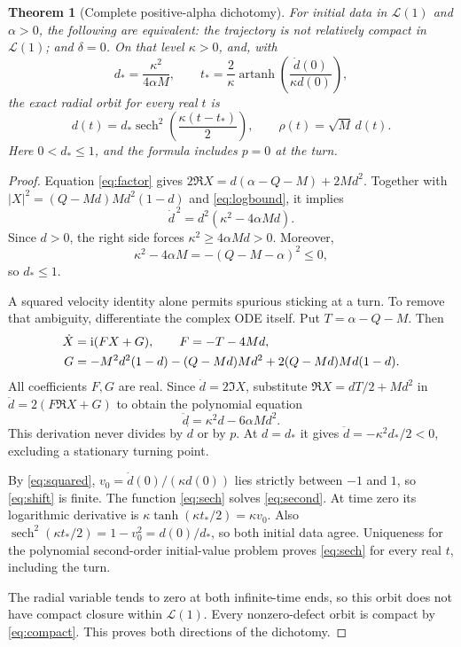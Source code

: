 \documentclass[10pt]{article}
\newcommand{\ii}{\mathrm i}
\newcommand{\LL}{\mathcal L}
\DeclareMathOperator{\sech}{sech}
\DeclareMathOperator{\artanh}{artanh}
\newtheorem{theorem}{Theorem}
\begin{document}
\begin{theorem}[Complete positive-alpha dichotomy]
For initial data in $\LL(1)$ and $\alpha>0$, the following are equivalent:
the trajectory is not relatively compact in $\LL(1)$; and $\delta=0$.
On that level $\kappa>0$, and, with
\begin{equation}
 d_*=\frac{\kappa^2}{4\alpha M},\qquad
 t_*=\frac2\kappa\artanh\left(\frac{\dot d(0)}{\kappa d(0)}\right),
 \label{eq:shift}
\end{equation}
the exact radial orbit for every real $t$ is
\begin{equation}
 d(t)=d_*\sech^2\left(\frac{\kappa(t-t_*)}{2}\right),\qquad
 \rho(t)=\sqrt M\,d(t).
 \label{eq:sech}
\end{equation}
Here $0<d_*\le1$, and the formula includes $p=0$ at the turn.
\end{theorem}
\begin{proof}
Equation \eqref{eq:factor} gives
$2\Re X=d(\alpha-Q-M)+2Md^2$.
Together with $|X|^2=(Q-Md)Md^2(1-d)$ and \eqref{eq:logbound}, it implies
\begin{equation}
 \dot d^{\,2}=d^2(\kappa^2-4\alpha Md).
 \label{eq:squared}
\end{equation}
Since $d>0$, the right side forces
$\kappa^2\ge4\alpha Md>0$. Moreover,
\begin{equation}
 \kappa^2-4\alpha M=-(Q-M-\alpha)^2\le0,
 \label{eq:dstar}
\end{equation}
so $d_*\le1$.

A squared velocity identity alone permits spurious sticking at a turn.
To remove that ambiguity, differentiate the complex ODE itself.
Put $T=\alpha-Q-M$. Then
\begin{align}
 \dot X&=\ii(FX+G),\qquad F=-T-4Md,\notag\\
 G&=-M^2d^2(1-d)-(Q-Md)Md^2
       +2(Q-Md)Md(1-d).
 \label{eq:xderivative}
\end{align}
All coefficients $F,G$ are real. Since $\dot d=2\Im X$,
substitute $\Re X=dT/2+Md^2$ in
$\ddot d=2(F\Re X+G)$ to obtain the polynomial equation
\begin{equation}
 \ddot d=\kappa^2d-6\alpha Md^2.
 \label{eq:second}
\end{equation}
This derivation never divides by $\dot d$ or by $p$.
At $d=d_*$ it gives $\ddot d=-\kappa^2d_*/2<0$,
excluding a stationary turning point.

By \eqref{eq:squared}, $v_0=\dot d(0)/(\kappa d(0))$ lies strictly between
$-1$ and $1$, so \eqref{eq:shift} is finite. The function
\eqref{eq:sech} solves \eqref{eq:second}.
At time zero its logarithmic derivative is
$\kappa\tanh(\kappa t_*/2)=\kappa v_0$.
Also $\sech^2(\kappa t_*/2)=1-v_0^2=d(0)/d_*$,
so both initial data agree.
Uniqueness for the polynomial second-order initial-value problem proves
\eqref{eq:sech} for every real $t$, including the turn.

The radial variable tends to zero at both infinite-time ends, so this orbit
does not have compact closure within $\LL(1)$.
Every nonzero-defect orbit is compact by \eqref{eq:compact}.
This proves both directions of the dichotomy.
\end{proof}
\end{document}
